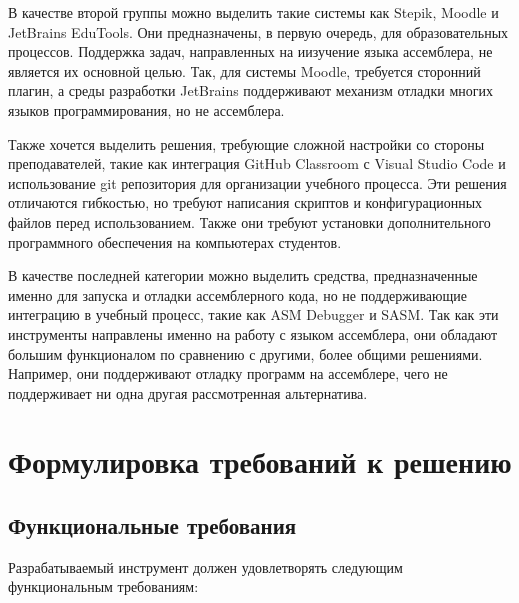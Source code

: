 \documentclass[a4paper,article,14pt]{extarticle}
\begin{document}
В качестве второй группы можно выделить такие системы как Stepik, Moodle и JetBrains EduTools. Они предназначены, в первую очередь, для образовательных процессов. Поддержка задач, направленных на иизучение языка ассемблера, не является их основной целью. Так, для системы Moodle, требуется сторонний плагин, а среды разработки JetBrains поддерживают механизм отладки многих языков программирования, но не ассемблера.

Также хочется выделить решения, требующие сложной настройки со стороны преподавателей, такие как интеграция GitHub Classroom с Visual Studio Code и использование git репозитория для организации учебного процесса. Эти решения отличаются гибкостью, но требуют написания скриптов и конфигурационных файлов перед использованием. Также они требуют установки дополнительного программного обеспечения на компьютерах студентов.

В качестве последней категории можно выделить средства, предназначенные именно для запуска и отладки ассемблерного кода, но не поддерживающие интеграцию в учебный процесс, такие как ASM Debugger и SASM. Так как эти инструменты направлены именно на работу с языком ассемблера, они обладают большим функционалом по сравнению с другими, более общими решениями. Например, они поддерживают отладку программ на ассемблере, чего не поддерживает ни одна другая рассмотренная альтернатива.

\section{Формулировка требований к решению}

\subsection{Функциональные требования}

Разрабатываемый инструмент должен удовлетворять следующим функциональным требованиям:
\end{document}
